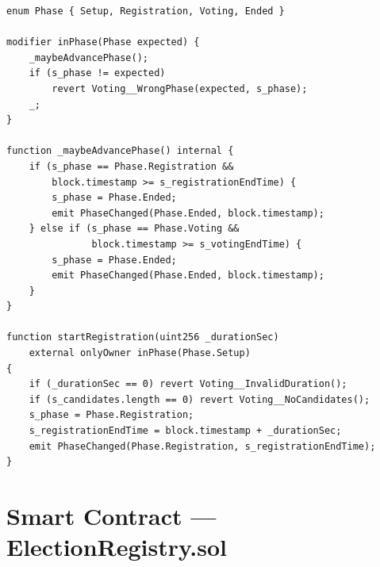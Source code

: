 \begin{lstlisting}[caption={Voting.sol --- Phase management}]
enum Phase { Setup, Registration, Voting, Ended }

modifier inPhase(Phase expected) {
    _maybeAdvancePhase();
    if (s_phase != expected)
        revert Voting__WrongPhase(expected, s_phase);
    _;
}

function _maybeAdvancePhase() internal {
    if (s_phase == Phase.Registration &&
        block.timestamp >= s_registrationEndTime) {
        s_phase = Phase.Ended;
        emit PhaseChanged(Phase.Ended, block.timestamp);
    } else if (s_phase == Phase.Voting &&
               block.timestamp >= s_votingEndTime) {
        s_phase = Phase.Ended;
        emit PhaseChanged(Phase.Ended, block.timestamp);
    }
}

function startRegistration(uint256 _durationSec)
    external onlyOwner inPhase(Phase.Setup)
{
    if (_durationSec == 0) revert Voting__InvalidDuration();
    if (s_candidates.length == 0) revert Voting__NoCandidates();
    s_phase = Phase.Registration;
    s_registrationEndTime = block.timestamp + _durationSec;
    emit PhaseChanged(Phase.Registration, s_registrationEndTime);
}
\end{lstlisting}

\section{Smart Contract --- ElectionRegistry.sol}

